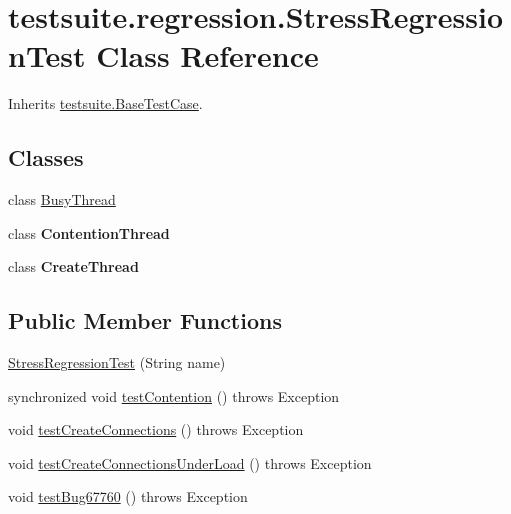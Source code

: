 \hypertarget{classtestsuite_1_1regression_1_1_stress_regression_test}{}\section{testsuite.\+regression.\+Stress\+Regression\+Test Class Reference}
\label{classtestsuite_1_1regression_1_1_stress_regression_test}


Inherits \mbox{\hyperlink{classtestsuite_1_1_base_test_case}{testsuite.\+Base\+Test\+Case}}.

\subsection*{Classes}
\begin{DoxyCompactItemize}
\item 
class \mbox{\hyperlink{classtestsuite_1_1regression_1_1_stress_regression_test_1_1_busy_thread}{Busy\+Thread}}
\item 
class {\bfseries Contention\+Thread}
\item 
class {\bfseries Create\+Thread}
\end{DoxyCompactItemize}
\subsection*{Public Member Functions}
\begin{DoxyCompactItemize}
\item 
\mbox{\hyperlink{classtestsuite_1_1regression_1_1_stress_regression_test_af77a090b18d23b503f859cc03238666a}{Stress\+Regression\+Test}} (String name)
\item 
synchronized void \mbox{\hyperlink{classtestsuite_1_1regression_1_1_stress_regression_test_a9e52f4e90a98cc513dfd3318d348c531}{test\+Contention}} ()  throws Exception 
\item 
void \mbox{\hyperlink{classtestsuite_1_1regression_1_1_stress_regression_test_a8253fc7fb64e884132640398b2bc5aed}{test\+Create\+Connections}} ()  throws Exception 
\item 
void \mbox{\hyperlink{classtestsuite_1_1regression_1_1_stress_regression_test_a1aff86540d35db22db56f48ffeb64b9d}{test\+Create\+Connections\+Under\+Load}} ()  throws Exception 
\item 
void \mbox{\hyperlink{classtestsuite_1_1regression_1_1_stress_regression_test_a21dd782b4c69fab5bcaee492e3400303}{test\+Bug67760}} ()  throws Exception 
\end{DoxyCompactItemize}
